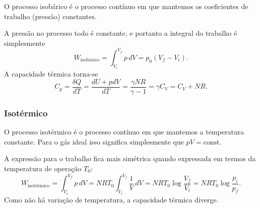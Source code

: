 O processo isobárico é o processo contínuo em que mantemos os coeficientes de
trabalho (pressão) constantes.
\begin{figure}[H]
    \centering
\end{figure}
A pressão no processo todo é constante, e portanto a integral do trabalho é
simplesmente
$$W_\text{isobárico}=\int_{V_i}^{V_f}p\,dV=p_0(V_f-V_i).$$
A capacidade térmica torna-se
$$C_p=\frac{\delta Q}{dT}=\frac{dU+pdV}{dT}=\frac{\gamma NR}{\gamma-1}
=\gamma C_V = C_V+NR.$$

\subsubsection{Isotérmico}

O processo isotérmico é o processo contínuo em que mantemos a temperatura
constante. Para o gás ideal isso significa simplesmente que $pV=\text{const.}$
\begin{figure}[H]
    \centering
\end{figure}
A expressão para o trabalho fica mais simétrica quando expressada em termos da
temperatura de operação $T_0$:
$$W_\text{isotérmico}=\int_{V_i}^{V_f}p\,dV=NRT_0\int_{V_i}^{V_f}\frac{1}{V}
\,dV= NRT_0\log\frac{V_f}{V_i}=NRT_0\log\frac{p_i}{p_f}.$$
Como não há variação de temperatura, a capacidade térmica diverge.

